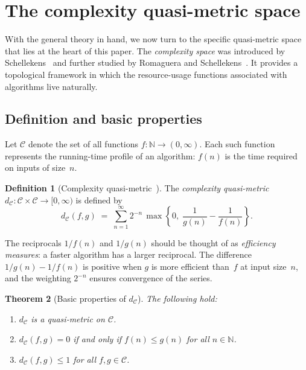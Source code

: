 \documentclass[11pt,a4paper]{article}
\theoremstyle{plain}
\newtheorem{theoreminner}{Theorem}[section]
\theoremstyle{definition}
\newtheorem{definitioninner}[theoreminner]{Definition}
\newenvironment{theorem}[1][]{\begin{theoreminner}[#1]}{\end{theoreminner}}
\newenvironment{definition}[1][]{\begin{definitioninner}[#1]}{\end{definitioninner}}
\newcommand{\N}{\mathbb{N}}
\newcommand{\C}{\mathcal{C}}
\begin{document}
\section{The complexity quasi-metric space}
\label{sec:complexity-space}

With the general theory in hand, we now turn to the specific
quasi-metric space that lies at the heart of this paper.  The
\emph{complexity space} was introduced by
Schellekens~\cite{schellekens1995} and further studied by Romaguera
and Schellekens~\cite{romaguera1999}.  It provides a topological
framework in which the resource-usage functions associated with
algorithms live naturally.

\subsection{Definition and basic properties}

Let $\C$ denote the set of all functions
$f\colon\N\to(0,\infty)$.  Each such function represents the
running-time profile of an algorithm: $f(n)$ is the time required
on inputs of size~$n$.

\begin{definition}[Complexity quasi-metric~\cite{schellekens1995}]
\label{def:dc}
The \emph{complexity quasi-metric} $d_\C\colon\C\times\C\to[0,\infty)$
is defined by
\[
  d_\C(f,g)
  \;=\; \sum_{n=1}^{\infty} 2^{-n}\,
    \max\!\left\{0,\;\frac{1}{g(n)}-\frac{1}{f(n)}\right\}.
\]
\end{definition}

The reciprocals $1/f(n)$ and $1/g(n)$ should be thought of as
\emph{efficiency measures}: a faster algorithm has a larger reciprocal.
The difference $1/g(n)-1/f(n)$ is positive when $g$ is more efficient
than~$f$ at input size~$n$, and the weighting $2^{-n}$ ensures
convergence of the series.

\begin{theorem}[Basic properties of $d_\C$]\label{thm:dc-props}
The following hold:
\begin{enumerate}[label=\textup{(\roman*)}]
  \item $d_\C$ is a quasi-metric on $\C$.
  \item $d_\C(f,g)=0$ if and only if $f(n)\le g(n)$ for all $n\in\N$.
  \item $d_\C(f,g)\le 1$ for all $f,g\in\C$.
\end{enumerate}
\end{theorem}
\end{document}
